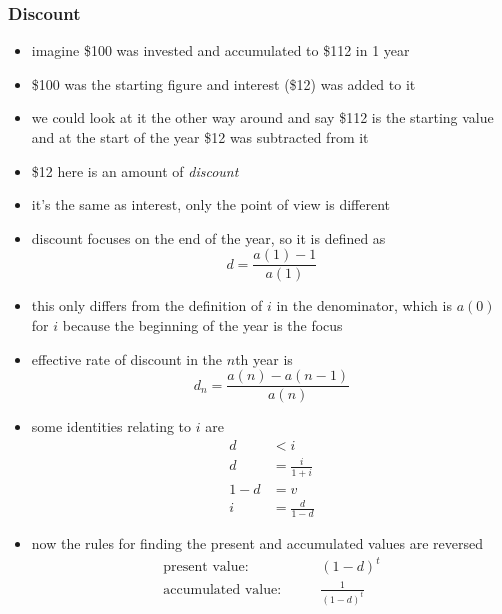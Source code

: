 \documentclass[../00_main.tex]{subfiles}
\begin{document}
\subsubsection{Discount}

\begin{itemize}
    \item imagine \$100 was invested and accumulated to \$112 in 1 year
    \item \$100 was the starting figure and interest (\$12) was added to it
    \item we could look at it the other way around and say \$112 is the
        starting value and at the start of the year \$12 was subtracted from it
    \item \$12 here is an amount of \textit{discount}
    \item it's the same as interest, only the point of view is different
    \item discount focuses on the end of the year, so it is defined as
        \begin{equation}\nonumber
            d = \frac{a(1) - 1}{a(1)}
        \end{equation}
    \item this only differs from the definition of $i$ in the denominator,
        which is $a(0)$ for $i$ because the beginning of the year is the focus
    \item effective rate of discount in the $n$th year is
        \begin{equation}\nonumber
            d_n = \frac{a(n) - a(n-1)}{a(n)}
        \end{equation}
    \item some identities relating to $i$ are
        \begin{equation}\nonumber
            \begin{aligned}
                d &< i                  \\
                d &= \frac{i}{1+i}      \\
                1 - d &= v              \\
                i &= \frac{d}{1-d}
            \end{aligned}
        \end{equation}
    \item now the rules for finding the present and accumulated values are
        reversed
        \begin{equation}\nonumber
            \begin{aligned}
                \text{present value}: \qquad &(1-d)^t   \\
                \text{accumulated value}: \qquad &\frac{1}{(1-d)^t}
            \end{aligned}
        \end{equation}
\end{itemize}
\end{document}
